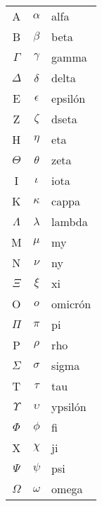 \begin{table}[h]
\begin{center}
\begin{tabular}{c|c|l}
    A & $\alpha$ & alfa  \\
    B & $\beta$ & beta \\
    $\Gamma$ & $\gamma$ & gamma \\
    $\Delta$ & $\delta$ & delta \\
    E & $\epsilon$ & epsilón\\
    Z & $\zeta$ & dseta \\
    H & $\eta$ & eta \\
    $\Theta$ & $\theta$ & zeta \\
    I & $\iota$ & iota \\
    K & $\kappa$ & cappa \\
    $\Lambda$ & $\lambda$ & lambda \\
    M & $\mu$ & my \\
    N & $\nu$ & ny \\
    $\Xi$ & $\xi$ & xi \\
    O & $o$  & omicrón \\
    $\Pi$ & $\pi$ & pi \\
    P & $\rho$ & rho \\
    $\Sigma$ & $\sigma$ & sigma \\
    T & $\tau$ & tau \\
    $\Upsilon$ & $\upsilon$ & ypsilón \\
    $\Phi$ & $\phi$ & fi \\
    X & $\chi$ & ji \\
    $\Psi$ & $\psi$ & psi \\
    $\Omega$ & $\omega$ & omega \\
\end{tabular}
\end{center}
\end{table}
